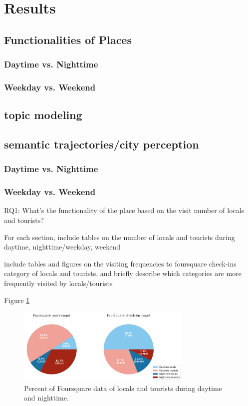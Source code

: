\documentclass{article}
\begin{document}
\section{Results}
\subsection{Functionalities of Places}
\subsubsection{Daytime vs. Nighttime}
\subsubsection{Weekday vs. Weekend}

\subsection{topic modeling}

\subsection{semantic trajectories/city perception}
\subsubsection{Daytime vs. Nighttime}
\subsubsection{Weekday vs. Weekend}

RQ1: What’s the functionality of the place based on the visit number of locals and tourists?

For each section,
include tables on the number of locals and tourists during daytime, nighttime/weekday, weekend

include tables and figures on the visiting frequencies to foursquare check-ins category of locals and tourists, and briefly describe which categories are more frequently visited by locals/tourists


Figure \ref{fig:foursquare_day_count_pie}
\begin{figure}
\centering
\includegraphics[width=0.75\textwidth]{figures/foursquare_day_count_pie.png}
\caption{\label{fig:foursquare_day_count_pie}Percent of Foursquare data of locals and tourists during daytime and nighttime.}
\end{figure}
\end{document}
